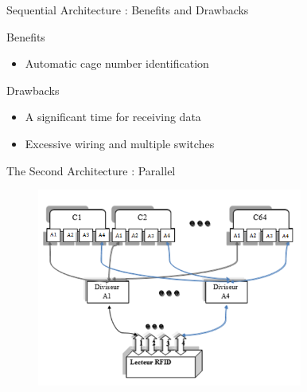 \documentclass[utf8,compress]{beamer}
\begin{document}
\begin{frame}{Sequential Architecture : Benefits and Drawbacks}



\begin{exampleblock}{Benefits}
\begin{itemize}
    \item Automatic cage number identification
\end{itemize}
\end{exampleblock}


\begin{alertblock}{Drawbacks}
\begin{itemize}
  \item A significant time for receiving data
 \item  Excessive wiring and multiple switches
\end{itemize}
\end{alertblock}
\end{frame}


\begin{frame}{The Second Architecture : Parallel}
\begin{figure}[htb]
    \center
    \includegraphics[height=6.5cm]{parallel_archi.png}
\end{figure}
 \end{frame}
\end{document}
